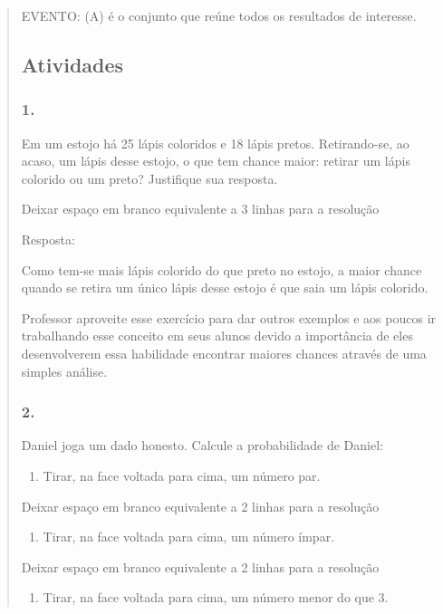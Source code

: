 \begin{enumerate}
\begin{escolha}
\begin{enumerate}
\begin{itemize}
\begin{itemize}
\begin{escolha}
\begin{quote}
\begin{escolha}
EVENTO: (A) é o conjunto que reúne todos os resultados de interesse.

\subsection{Atividades}\label{atividades-6}

\subsubsection{1.}\label{section-78}

Em um estojo há 25 lápis coloridos e 18 lápis pretos. Retirando-se, ao
acaso, um lápis desse estojo, o que tem chance maior: retirar um lápis
colorido ou um preto? Justifique sua resposta.

Deixar espaço em branco equivalente a 3 linhas para a resolução

Resposta:

Como tem-se mais lápis colorido do que preto no estojo, a maior chance
quando se retira um único lápis desse estojo é que saia um lápis
colorido.

Professor aproveite esse exercício para dar outros exemplos e aos poucos
ir trabalhando esse conceito em seus alunos devido a importância de eles
desenvolverem essa habilidade encontrar maiores chances através de uma
simples análise.

\subsubsection{2.}\label{section-79}

Daniel joga um dado honesto. Calcule a probabilidade de Daniel:

\begin{enumerate}
\def\labelenumi{\alph{enumi})}
\item
  Tirar, na face voltada para cima, um número par.
\end{enumerate}

Deixar espaço em branco equivalente a 2 linhas para a resolução

\begin{enumerate}
\def\labelenumi{\alph{enumi})}
\item
  Tirar, na face voltada para cima, um número ímpar.
\end{enumerate}

Deixar espaço em branco equivalente a 2 linhas para a resolução

\begin{enumerate}
\def\labelenumi{\alph{enumi})}
\item
  Tirar, na face voltada para cima, um número menor do que 3.
\end{enumerate}


\end{escolha}
\end{quote}
\end{escolha}
\end{itemize}
\end{itemize}
\end{enumerate}
\end{escolha}
\end{enumerate}
